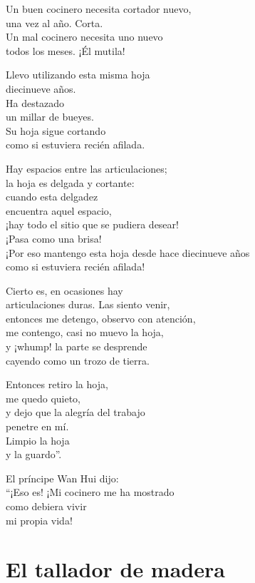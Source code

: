 \documentclass[book,b5paper,hidelinks,final]{memoir}
\begin{document}
	Un buen cocinero necesita cortador nuevo,\\
	una vez al año. Corta.\\
	Un mal cocinero necesita uno nuevo\\
	todos los meses. ¡Él mutila!
	
	Llevo utilizando esta misma hoja\\
	diecinueve años.\\
	Ha destazado\\
	un millar de bueyes.\\
	Su hoja sigue cortando\\
	como si estuviera recién afilada.
	
	Hay espacios entre las articulaciones;\\
	la hoja es delgada y cortante:\\
	cuando esta delgadez\\
	encuentra aquel espacio,\\
	¡hay todo el sitio que se pudiera desear!\\
	¡Pasa como una brisa!\\
	¡Por eso mantengo esta hoja desde hace diecinueve años\\
	como si estuviera recién afilada!
	
	Cierto es, en ocasiones hay\\
	articulaciones duras. Las siento venir,\\
	entonces me detengo, observo con atención,\\
	me contengo, casi no muevo la hoja,\\
	y ¡whump! la parte se desprende\\
	cayendo como un trozo de tierra.
	
	Entonces retiro la hoja,\\
	me quedo quieto,\\
	y dejo que la alegría del trabajo\\
	penetre en mí.\\
	Limpio la hoja\\
	y la guardo''.
	
	El príncipe Wan Hui dijo:\\
	``¡Eso es! ¡Mi cocinero me ha mostrado\\
	como debiera vivir\\
	mi propia vida!
	
	\chapter*{El tallador de madera}
	
\end{document}
